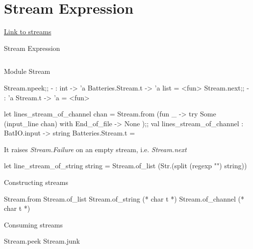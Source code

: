 \section{Stream Expression}

\href{http://mirror.ocamlcore.org/ocaml-tutorial.org/streams.html}{Link
  to streams}

Stream Expression


\inputminted[fontsize=\scriptsize]{ocaml}{lang/code/stream/test_stream.ml}



Module Stream
\begin{alternate}
Stream.npeek;;
- : int -> 'a Batteries.Stream.t -> 'a list = <fun>
Stream.next;;
- : 'a Stream.t -> 'a = <fun>
\end{alternate}



\begin{ocamlcode}
let lines_stream_of_channel chan = Stream.from (fun _ -> 
    try Some (input_line chan) with End_of_file -> None );;
val lines_stream_of_channel : BatIO.input -> string Batteries.Stream.t =
\end{ocamlcode}


It raises \textit{Stream.Failure} on an empty stream,
i.e. \textit{Stream.next}

\begin{ocamlcode}
let line_stream_of_string string =
  Stream.of_list (Str.(split (regexp "\n") string))
\end{ocamlcode}

Constructing streams \\
  \begin{bluetext}
    Stream.from
    Stream.of_list
    Stream.of_string (* char t *)
    Stream.of_channel (* char t *)
  \end{bluetext}

Consuming streams \\

\begin{bluetext}
   Stream.peek
   Stream.junk
\end{bluetext}

